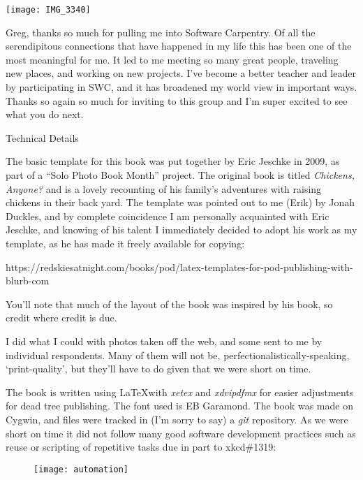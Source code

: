 \newpage

\begin{center}
\texttt{[image: IMG\_3340]}
\end{center}

Greg, thanks so much for pulling me into Software Carpentry. Of all the
serendipitous connections that have happened in my life this has been one
of the most meaningful for me. It led to me meeting so many great people,
traveling new places, and working on new projects. I've become a better
teacher and leader by participating in SWC, and it has broadened my world
view in important ways. Thanks so again so much for inviting to this group
and I'm super excited to see what you do next.


\newpage

{\LARGE Technical Details}

The basic template for this book was put together by Eric Jeschke in
2009, as part of a ``Solo Photo Book Month'' project.  The original book
is titled \textit{Chickens, Anyone?} and is a lovely recounting of his
family's adventures with raising chickens in their back yard.  The template
was pointed out to me (Erik) by Jonah Duckles, and by complete coincidence
I am personally acquainted with Eric Jeschke, and knowing of his talent I
immediately decided to adopt his work as my template, as he has made it
freely available for copying:

https://redskiesatnight.com/books/pod/latex-templates-for-pod-publishing-with-blurb-com

You'll note that much of the layout of the book was inspired by his book,
so credit where credit is due.

I did what I could with photos taken off the web, and some sent to me by
individual respondents.  Many of them will not be,
perfectionalistically-speaking, `print-quality', but they'll have to do given
that we were short on time.

The book is written using \LaTeX with {\em xetex} and {\em xdvipdfmx} for
easier adjustments for dead tree publishing.  The font used is EB Garamond.
The book was made on Cygwin, and files were tracked in (I'm sorry to say) a
{\em git} repository.  As we were short on time it did not follow many good
software development practices such as reuse or scripting of repetitive tasks
due in part to xkcd\#1319:
\begin{figure}[h!]
\centering
\texttt{[image: automation]}
\end{figure}

